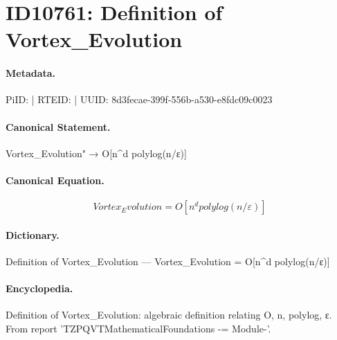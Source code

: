 \section*{ID10761: Definition of Vortex\_Evolution}
\paragraph{Metadata.}
PiID:  | RTEID:  | UUID: 8d3fecae-399f-556b-a530-e8fdc09c0023

\paragraph{Canonical Statement.}
Vortex\_Evolution" → O[n\textasciicircum{}d polylog(n/ε)]

\paragraph{Canonical Equation.}
\[
Vortex_Evolution = O[n^d polylog(n/ε)]
\]

\paragraph{Dictionary.}
Definition of Vortex\_Evolution — Vortex\_Evolution = O[n\textasciicircum{}d polylog(n/ε)]

\paragraph{Encyclopedia.}
Definition of Vortex\_Evolution: algebraic definition relating O, n, polylog, ε. From report 'TZPQVTMathematicalFoundations -= Module-'.
